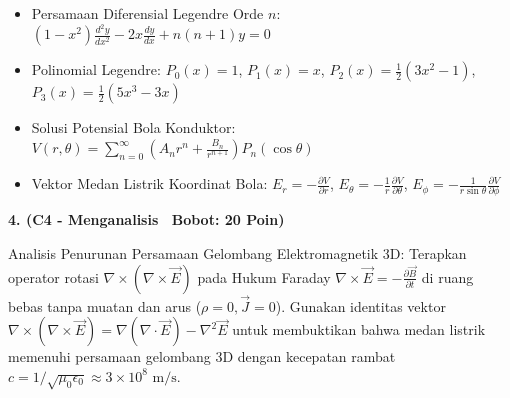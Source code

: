 \documentclass[10pt,a4paper]{article}
\begin{document}
\vfill

\begin{tcolorbox}[colback=unibblue!3,colframe=unibblue,colbacktitle=unibblue,coltitle=white,boxrule=0.6pt,arc=2pt,left=6pt,right=6pt,top=3pt,bottom=3pt,title=\textbf{\scriptsize FORMULA RUJUKAN TEKNIS \& STANDAR INDUSTRI TERKAIT}]
  \scriptsize
  \begin{itemize}[leftmargin=*, nosep]
  \item Persamaan Diferensial Legendre Orde $n$: $(1-x^2) \frac{d^2 y}{dx^2} - 2x \frac{dy}{dx} + n(n+1) y = 0$
  \item Polinomial Legendre: $P_0(x) = 1$, $P_1(x) = x$, $P_2(x) = \frac{1}{2}(3x^2 - 1)$, $P_3(x) = \frac{1}{2}(5x^3 - 3x)$
  \item Solusi Potensial Bola Konduktor: $V(r,\theta) = \sum_{n=0}^\infty \left( A_n r^n + \frac{B_n}{r^{n+1}} \right) P_n(\cos\theta)$
  \item Vektor Medan Listrik Koordinat Bola: $E_r = -\frac{\partial V}{\partial r}$, $E_\theta = -\frac{1}{r}\frac{\partial V}{\partial \theta}$, $E_\phi = -\frac{1}{r\sin\theta}\frac{\partial V}{\partial \phi}$
\end{itemize}
\end{tcolorbox}

\newpage

\par
\vspace{1mm}

\noindent\textbf{4. (C4 - Menganalisis \textbar\ Bobot: 20 Poin)}\par\vspace{0.8mm}
{\footnotesize Analisis Penurunan Persamaan Gelombang Elektromagnetik 3D: Terapkan operator rotasi $\nabla \times (\nabla \times \vec{E})$ pada Hukum Faraday $\nabla \times \vec{E} = -\frac{\partial \vec{B}}{\partial t}$ di ruang bebas tanpa muatan dan arus ($\rho=0, \vec{J}=0$). Gunakan identitas vektor $\nabla \times (\nabla \times \vec{E}) = \nabla(\nabla \cdot \vec{E}) - \nabla^2 \vec{E}$ untuk membuktikan bahwa medan listrik memenuhi persamaan gelombang 3D dengan kecepatan rambat $c = 1/\sqrt{\mu_0 \epsilon_0} \approx 3 \times 10^8\text{ m/s}$.}\par

\vspace{3.5mm}
\end{document}
